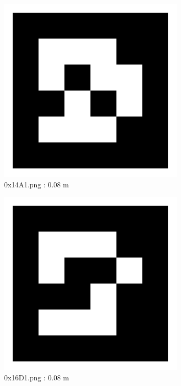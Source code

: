 \documentclass[11pt,a4,BCOR=0cm]{scrartcl}
\begin{document}
\begin{figure}
  \centering
    \includegraphics[width=8.955cm]{0x14A1.pdf}
    \caption{0x14A1.png : 0.08 m}
    \label{fig:0x14A1.pdf}
  
\end{figure} 

\clearpage

\begin{figure}
  \centering
    \includegraphics[width=8.955cm]{0x16D1.pdf}
    \caption{0x16D1.png : 0.08 m}
    \label{fig:0x16D1.pdf}
  
\end{figure} 
\end{document}

